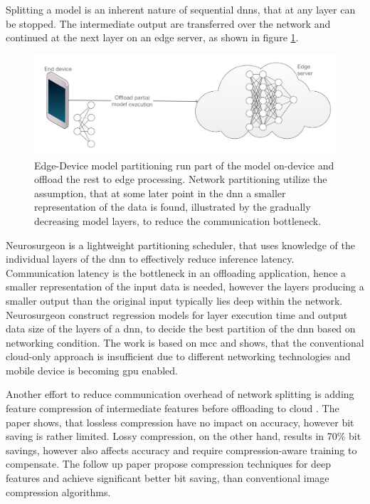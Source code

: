 Splitting a model is an inherent nature of sequential \gls{dnn}s, that at any layer can be stopped. The intermediate output are transferred over the network and continued at the next layer on an edge server, as shown in figure \ref{fig:offlaoding}.

\begin{figure}
	\centering
	\includegraphics[width=\linewidth]{figures/models/partitioning}
	\caption[Model partitioning]{Edge-Device model partitioning run part of the model on-device and offload the rest to edge processing. Network partitioning utilize the assumption, that at some later point in the \gls{dnn} a smaller representation of the data is found, illustrated by the gradually decreasing model layers, to reduce the communication bottleneck. }
	\label{fig:offlaoding}
\end{figure}

Neurosurgeon \cite{kang_neurosurgeon:_2017} is a lightweight partitioning scheduler, that uses knowledge of the individual layers of the \gls{dnn} to effectively reduce inference latency. Communication latency is the bottleneck in an offloading application, hence a smaller representation of the input data is needed, however the layers producing a smaller output than the original input typically lies deep within the network. Neurosurgeon construct regression models for layer execution time and  output data size of the layers of a \gls{dnn}, to decide the best partition of the \gls{dnn} based on networking condition. The work is based on \gls{mcc} and shows, that the conventional cloud-only approach is insufficient due to different networking technologies and mobile device is becoming \gls{gpu} enabled. 

Another effort to reduce communication overhead of network splitting is adding feature compression of intermediate features before offloading to cloud \cite{choi_deep_2018}. The paper shows, that lossless compression have no impact on accuracy, however bit saving is rather limited. Lossy compression, on the other hand, results in 70\% bit savings, however also affects accuracy and require compression-aware training to compensate. The follow up paper \cite{choi_near-lossless_2018} propose compression techniques for deep features and achieve significant better bit saving, than conventional image compression algorithms.


